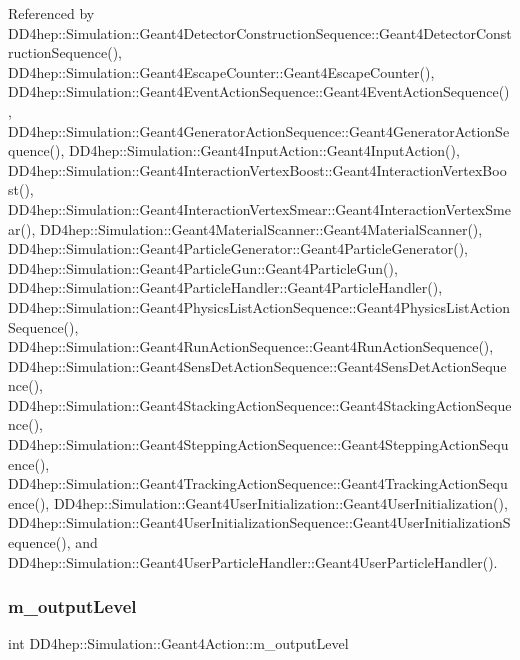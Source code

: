 Referenced by D\+D4hep\+::\+Simulation\+::\+Geant4\+Detector\+Construction\+Sequence\+::\+Geant4\+Detector\+Construction\+Sequence(), D\+D4hep\+::\+Simulation\+::\+Geant4\+Escape\+Counter\+::\+Geant4\+Escape\+Counter(), D\+D4hep\+::\+Simulation\+::\+Geant4\+Event\+Action\+Sequence\+::\+Geant4\+Event\+Action\+Sequence(), D\+D4hep\+::\+Simulation\+::\+Geant4\+Generator\+Action\+Sequence\+::\+Geant4\+Generator\+Action\+Sequence(), D\+D4hep\+::\+Simulation\+::\+Geant4\+Input\+Action\+::\+Geant4\+Input\+Action(), D\+D4hep\+::\+Simulation\+::\+Geant4\+Interaction\+Vertex\+Boost\+::\+Geant4\+Interaction\+Vertex\+Boost(), D\+D4hep\+::\+Simulation\+::\+Geant4\+Interaction\+Vertex\+Smear\+::\+Geant4\+Interaction\+Vertex\+Smear(), D\+D4hep\+::\+Simulation\+::\+Geant4\+Material\+Scanner\+::\+Geant4\+Material\+Scanner(), D\+D4hep\+::\+Simulation\+::\+Geant4\+Particle\+Generator\+::\+Geant4\+Particle\+Generator(), D\+D4hep\+::\+Simulation\+::\+Geant4\+Particle\+Gun\+::\+Geant4\+Particle\+Gun(), D\+D4hep\+::\+Simulation\+::\+Geant4\+Particle\+Handler\+::\+Geant4\+Particle\+Handler(), D\+D4hep\+::\+Simulation\+::\+Geant4\+Physics\+List\+Action\+Sequence\+::\+Geant4\+Physics\+List\+Action\+Sequence(), D\+D4hep\+::\+Simulation\+::\+Geant4\+Run\+Action\+Sequence\+::\+Geant4\+Run\+Action\+Sequence(), D\+D4hep\+::\+Simulation\+::\+Geant4\+Sens\+Det\+Action\+Sequence\+::\+Geant4\+Sens\+Det\+Action\+Sequence(), D\+D4hep\+::\+Simulation\+::\+Geant4\+Stacking\+Action\+Sequence\+::\+Geant4\+Stacking\+Action\+Sequence(), D\+D4hep\+::\+Simulation\+::\+Geant4\+Stepping\+Action\+Sequence\+::\+Geant4\+Stepping\+Action\+Sequence(), D\+D4hep\+::\+Simulation\+::\+Geant4\+Tracking\+Action\+Sequence\+::\+Geant4\+Tracking\+Action\+Sequence(), D\+D4hep\+::\+Simulation\+::\+Geant4\+User\+Initialization\+::\+Geant4\+User\+Initialization(), D\+D4hep\+::\+Simulation\+::\+Geant4\+User\+Initialization\+Sequence\+::\+Geant4\+User\+Initialization\+Sequence(), and D\+D4hep\+::\+Simulation\+::\+Geant4\+User\+Particle\+Handler\+::\+Geant4\+User\+Particle\+Handler().

\hypertarget{class_d_d4hep_1_1_simulation_1_1_geant4_action_a6dc880b8e55e2dada947ad06d7678dd4}{}\label{class_d_d4hep_1_1_simulation_1_1_geant4_action_a6dc880b8e55e2dada947ad06d7678dd4} 
\subsubsection{\texorpdfstring{m\+\_\+output\+Level}{m\_outputLevel}}
{\footnotesize\ttfamily int D\+D4hep\+::\+Simulation\+::\+Geant4\+Action\+::m\+\_\+output\+Level\hspace{0.3cm}{\ttfamily [protected]}}



